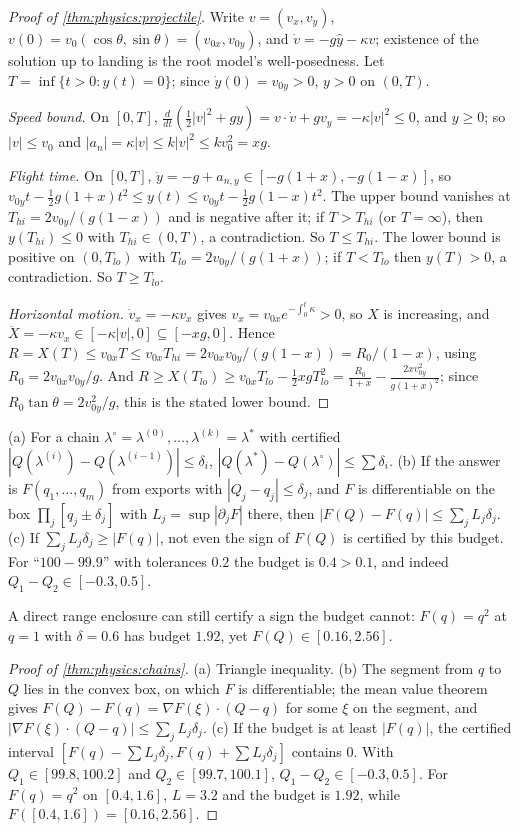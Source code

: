 \begin{proof}[Proof of \cref{thm:physics:projectile}]
Write $v=(v_x,v_y)$, $v(0)=v_0(\cos\theta,\sin\theta)=(v_{0x},v_{0y})$, and
$\dot v=-g\hat y-\kappa v$; existence of the solution up to landing is the root model's
well-posedness. Let $T=\inf\{t>0:y(t)=0\}$; since $\dot y(0)=v_{0y}>0$, $y>0$ on $(0,T)$.

\emph{Speed bound.} On $[0,T]$,
$\frac{d}{dt}(\frac12|v|^2+gy)=v\cdot\dot v+gv_y=-\kappa|v|^2\le0$, and $y\ge0$; so
$|v|\le v_0$ and $|a_n|=\kappa|v|\le k|v|^2\le kv_0^2=xg$.

\emph{Flight time.} On $[0,T]$, $\ddot y=-g+a_{n,y}\in[-g(1+x),-g(1-x)]$, so
$v_{0y}t-\frac12g(1+x)t^2\le y(t)\le v_{0y}t-\frac12g(1-x)t^2$. The upper bound vanishes at
$T_{hi}=2v_{0y}/(g(1-x))$ and is negative after it; if $T>T_{hi}$ (or $T=\infty$), then
$y(T_{hi})\le0$ with $T_{hi}\in(0,T)$, a contradiction. So $T\le T_{hi}$. The lower bound is
positive on $(0,T_{lo})$ with $T_{lo}=2v_{0y}/(g(1+x))$; if $T<T_{lo}$ then $y(T)>0$, a
contradiction. So $T\ge T_{lo}$.

\emph{Horizontal motion.} $\dot v_x=-\kappa v_x$ gives $v_x=v_{0x}e^{-\int_0^t\kappa}>0$, so $X$
is increasing, and $\ddot X=-\kappa v_x\in[-\kappa|v|,0]\subseteq[-xg,0]$. Hence
$R=X(T)\le v_{0x}T\le v_{0x}T_{hi}=2v_{0x}v_{0y}/(g(1-x))=R_0/(1-x)$, using
$R_0=2v_{0x}v_{0y}/g$. And
$R\ge X(T_{lo})\ge v_{0x}T_{lo}-\frac12xgT_{lo}^2=\frac{R_0}{1+x}-\frac{2xv_{0y}^2}{g(1+x)^2}$;
since $R_0\tan\theta=2v_{0y}^2/g$, this is the stated lower bound.
\end{proof}

\begin{theorem}\label{thm:physics:chains}
(a) For a chain $\lambda^\circ=\lambda^{(0)},\dots,\lambda^{(k)}=\lambda^*$ with certified
$|Q(\lambda^{(i)})-Q(\lambda^{(i-1)})|\le\delta_i$, $|Q(\lambda^*)-Q(\lambda^\circ)|\le\sum\delta_i$.
(b) If the answer is $F(q_1,\dots,q_m)$ from exports with $|Q_j-q_j|\le\delta_j$, and $F$ is
differentiable on the box $\prod_j[q_j\pm\delta_j]$ with $L_j=\sup|\partial_jF|$ there, then
$|F(Q)-F(q)|\le\sum_jL_j\delta_j$. (c) If $\sum_jL_j\delta_j\ge|F(q)|$, not even the sign of
$F(Q)$ is certified by this budget. For ``$100-99.9$'' with tolerances $0.2$ the budget is
$0.4>0.1$, and indeed $Q_1-Q_2\in[-0.3,0.5]$.
\end{theorem}
A direct range enclosure can still certify a sign the budget cannot: $F(q)=q^2$ at $q=1$ with
$\delta=0.6$ has budget $1.92$, yet $F(Q)\in[0.16,2.56]$.
\begin{proof}[Proof of \cref{thm:physics:chains}]
(a) Triangle inequality. (b) The segment from $q$ to $Q$ lies in the convex box, on which
$F$ is differentiable; the mean value theorem gives $F(Q)-F(q)=\nabla F(\xi)\cdot(Q-q)$ for
some $\xi$ on the segment, and $|\nabla F(\xi)\cdot(Q-q)|\le\sum_jL_j\delta_j$. (c) If the
budget is at least $|F(q)|$, the certified interval
$[F(q)-\sum L_j\delta_j,F(q)+\sum L_j\delta_j]$ contains $0$. With $Q_1\in[99.8,100.2]$ and
$Q_2\in[99.7,100.1]$, $Q_1-Q_2\in[-0.3,0.5]$. For $F(q)=q^2$ on $[0.4,1.6]$, $L=3.2$ and the
budget is $1.92$, while $F([0.4,1.6])=[0.16,2.56]$.
\end{proof}

